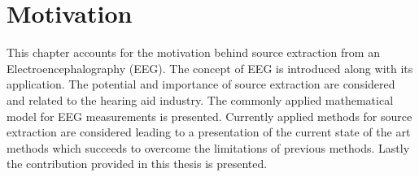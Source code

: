 \chapter{Motivation}\label{ch:motivation}
 This chapter accounts for the motivation behind source extraction from an Electroencephalography (EEG). The concept of EEG is introduced along with its application. The potential and importance of source extraction are considered and related to the hearing aid industry. The commonly applied mathematical model for EEG measurements is presented. Currently applied methods for source extraction are considered leading to a presentation of the current state of the art methods which succeeds to overcome the limitations of previous methods. Lastly the contribution provided in this thesis is presented.          


